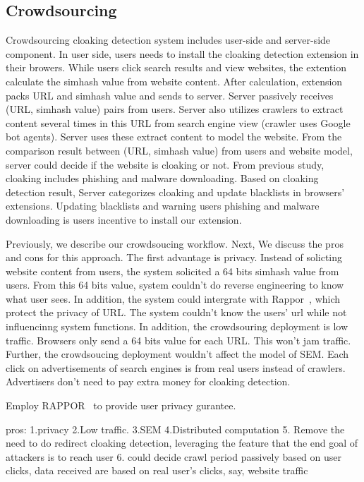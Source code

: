 \subsection{Crowdsourcing}
Crowdsourcing cloaking detection system includes user-side and server-side component. In user side, users needs to install the cloaking
detection extension in their browers. While users click search results and view websites, the extention calculate the simhash value from
website content. After calculation, extension packs URL and simhash value and sends to server. Server passively receives (URL, simhash value)
 pairs from users. Server also utilizes crawlers to extract content several times in this URL from search engine view (crawler uses Google bot agents).
 Server uses these extract content to model the website. From the comparison result between (URL, simhash value) from users and website model,
 server could decide if the website is cloaking or not. From previous study, cloaking includes phishing and malware downloading. Based on cloaking
 detection result, Server categorizes cloaking and update blacklists in browsers' extensions. Updating blacklists and warning users phishing and
 malware downloading is users incentive to install our extension. 

 Previously, we describe our crowdsoucing workflow. Next, We discuss the pros and cons for this approach. The first advantage is privacy. Instead of solicting
 website content from users, the system solicited a 64 bits simhash value from users. From this 64 bits value, system couldn't do reverse engineering to
 know what user sees. In addition, the system could intergrate with Rappor~\cite{erlingsson2014rappor}, which protect the privacy of URL. The system couldn't
 know the users' url while not influencinng system functions. In addition, the crowdsouring deployment is low traffic. Browsers only  send a 64 bits value for
 each URL. This won't jam traffic. Further, the crowdsoucing deployment wouldn't affect the model of SEM. Each click on advertisements of search engines is
 from real users instead of crawlers. Advertisers don't need to pay extra money for cloaking detection. 


Employ RAPPOR~\cite{erlingsson2014rappor} to provide user privacy gurantee.

pros: 	1.privacy 2.Low traffic. 3.SEM 4.Distributed computation 
5. Remove the need to do redirect cloaking detection, leveraging the feature
that the end goal of attackers is to reach user
6. could decide crawl period passively based on user clicks, data received are
based on real user’s clicks, say, website traffic

